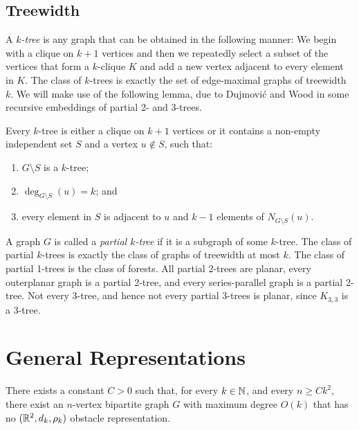 \documentclass{patmorin}
\begin{document}
\subsection{Treewidth}

A \emph{$k$-tree} is any graph that can be obtained in the following
manner:  We begin with a clique on $k+1$ vertices and then we repeatedly
select a subset of the vertices that form a $k$-clique $K$ and add a
new vertex adjacent to every element in $K$.  The class of $k$-trees is
exactly the set of edge-maximal graphs of treewidth $k$.  We will make
use of the following lemma, due to Dujmovi\'c and Wood \cite[Lemma~Y]{X}
in some recursive embeddings of partial 2- and 3-trees.

\begin{lem}
   Every $k$-tree is either a clique on $k+1$ vertices or it contains a non-empty independent set $S$ and a vertex $u\not\in S$, such that:
\begin{enumerate}
   \item $G\setminus S$ is a $k$-tree;
   \item $\deg_{G\setminus S}(u)=k$; and 
   \item every element in $S$ is adjacent to $u$ and $k-1$ elements of
   $N_{G\setminus S}(u)$.
\end{enumerate}
\end{lem}

A graph $G$ is called a \emph{partial $k$-tree} if it is a subgraph of
some $k$-tree.  The class of partial $k$-trees is exactly the class of
graphs of treewidth at most $k$.  The class of partial 1-trees is the
class of forests.  All partial 2-trees are planar, every outerplanar graph
is a partial 2-tree, and every series-parallel graph is a partial 2-tree.
Not every 3-tree, and hence not every partial 3-trees is planar, since
$K_{3,3}$ is a 3-tree.

\section{General Representations}

\begin{thm}
  There exists a constant $C>0$ such that, for every $k\in \mathbb{N}$, and every
  $n\ge Ck^2$, there exist an $n$-vertex bipartite graph $G$ with maximum
  degree $O(k)$ that has no $(\mathbb{R}^2,d_k,\rho_k)$ obstacle representation.
\end{thm}
\end{document}
